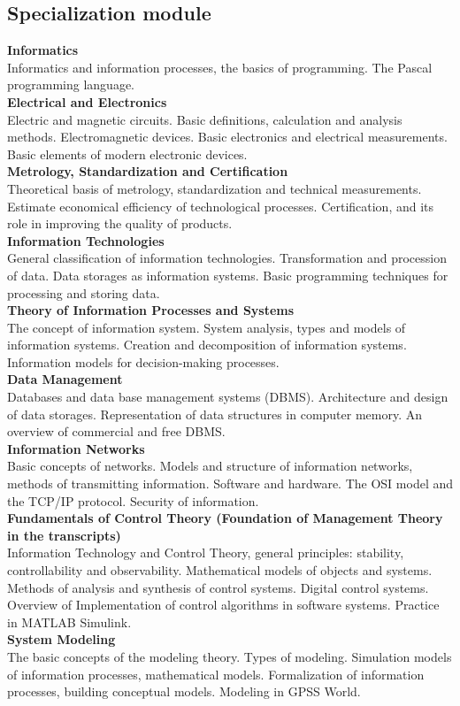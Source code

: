 \documentclass[a4paper, 12pt]{article}
\newcommand{\group}[1] {\subsection{#1}}
\newcommand{\discipline}[1] {\textbf{#1} \\ }
\newcommand{\desc}[1] { #1 \\ }
\begin{document}
\group{Specialization module}

\discipline{Informatics}
\desc{Informatics and information processes, the basics of programming. The Pascal programming language.}

\discipline{Electrical and Electronics}
\desc{Electric and magnetic circuits. Basic definitions, calculation and analysis methods. Electromagnetic devices. Basic electronics and electrical measurements. Basic elements of modern electronic devices.}

\discipline{Metrology, Standardization and Certification}
\desc{Theoretical basis of metrology, standardization and technical measurements. Estimate economical efficiency of technological processes. Certification, and its role in improving the quality of products.}

\discipline{Information Technologies}
\desc{General classification of information technologies. Transformation and procession of data. Data storages as information systems. Basic programming techniques for processing and storing data.}

\discipline{Theory of Information Processes and Systems}
\desc{The concept of information system. System analysis, types and models of information systems. Creation and decomposition of information systems. Information models for decision-making processes.}

\discipline{Data Management}
\desc{Databases and data base management systems (DBMS). Architecture and design of data storages. Representation of data structures in computer memory. An overview of commercial and free DBMS.}

\discipline{Information Networks}
\desc{Basic concepts of networks. Models and structure of information networks, methods of transmitting information. Software and hardware. The OSI model and the TCP/IP protocol. Security of information.}

\discipline{Fundamentals of Control Theory (Foundation of Management Theory in the transcripts)}
\desc{Information Technology and Control Theory, general principles: stability, controllability and observability. Mathematical models of objects and systems. Methods of analysis and synthesis of control systems. Digital control systems. Overview of Implementation of control algorithms in software systems. Practice in MATLAB Simulink.}

\discipline{System Modeling}
\desc{The basic concepts of the modeling theory. Types of modeling. Simulation models of information processes, mathematical models. Formalization of information processes, building conceptual models. Modeling in GPSS World.}
\end{document}
